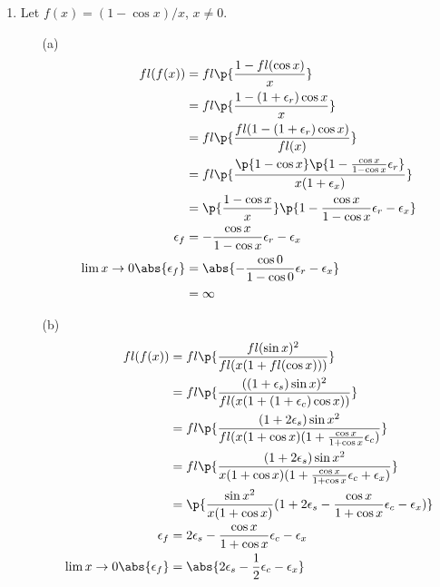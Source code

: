 \documentclass[11pt]{article}
\begin{document}
\begin{enumerate}
    \item %
        Let $f(x) = (1 - \cos{x})/x$, $x \neq 0$.
        \begin{enumerate}
            \item[(a)]
                \begin{align*}
                    fl(f(x)) &= fl\p{\frac{1 - fl(\cos{x})}{x}} \\
                    &= fl\p{\frac{1 - (1 + \epsilon_r)\cos{x}}{x}} \\
                    &= fl\p{\frac{fl(1 - (1 + \epsilon_r)\cos{x})}{fl(x)}} \\
                    &= fl\p{\frac{\p{1 - \cos{x}}\p{1 - \frac{\cos{x}}{1 - \cos{x}} \epsilon_r}}{x(1 + \epsilon_x)}} \\
                    &= \p{\frac{1 - \cos{x}}{x}}\p{1 - \frac{\cos{x}}{1 - \cos{x}} \epsilon_r - \epsilon_x} \\
                \epsilon_f &= -\frac{\cos{x}}{1 - \cos{x}} \epsilon_r - \epsilon_x \\
                \lim{x \to 0}{\abs{\epsilon_f}} &= \abs{-\frac{\cos{0}}{1 - \cos{0}} \epsilon_r - \epsilon_x} \\
                    &= \infty
                \end{align*}

            \item[(b)]
                \begin{align*}
                    fl(f(x)) &= fl\p{\frac{fl(\sin{x})^2}{fl(x(1 + fl(\cos{x})))}} \\
                    &= fl\p{\frac{((1 + \epsilon_s)\sin{x})^2}{fl(x(1 + (1 + \epsilon_c)\cos{x}))}} \\
                    &= fl\p{\frac{(1 + 2\epsilon_s)\sin{x}^2}{fl(x(1 + \cos{x})(1 + \frac{\cos{x}}{1 + \cos{x}}\epsilon_c)}} \\
                    &= fl\p{\frac{(1 + 2\epsilon_s)\sin{x}^2}{x(1 + \cos{x})(1 + \frac{\cos{x}}{1 + \cos{x}}\epsilon_c + \epsilon_x)}} \\
                    &= \p{\frac{\sin{x}^2}{x(1 + \cos{x})}(1 + 2\epsilon_s - \frac{\cos{x}}{1 + \cos{x}}\epsilon_c - \epsilon_x)} \\
                    \epsilon_f &= 2\epsilon_s - \frac{\cos{x}}{1 + \cos{x}}\epsilon_c - \epsilon_x \\
                    \lim{x \to 0}{\abs{\epsilon_f}} &= \abs{2\epsilon_s - \frac{1}{2}\epsilon_c - \epsilon_x}
                \end{align*}


\end{enumerate}
\end{enumerate}
\end{document}

